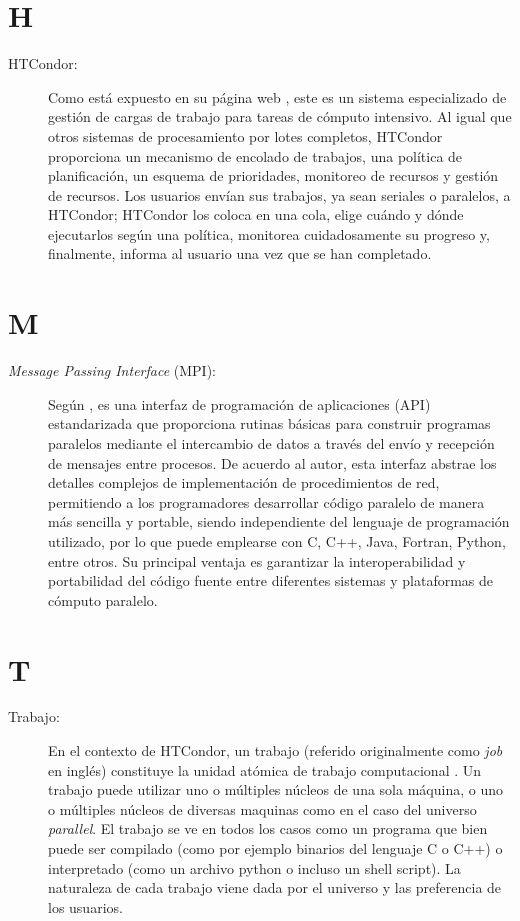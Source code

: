 \section*{H}
\begin{description}
	\item[HTCondor:] Como está expuesto en su página web \citep{HTCondor}, este es un sistema especializado de gestión de cargas de trabajo para tareas de cómputo intensivo. Al igual que otros sistemas de procesamiento por lotes completos, HTCondor proporciona un mecanismo de encolado de trabajos, una política de planificación, un esquema de prioridades, monitoreo de recursos y gestión de recursos. Los usuarios envían sus trabajos, ya sean seriales o paralelos, a HTCondor; HTCondor los coloca en una cola, elige cuándo y dónde ejecutarlos según una política, monitorea cuidadosamente su progreso y, finalmente, informa al usuario una vez que se han completado.
\end{description}

\section*{M}
\begin{description}
	\item[\textit{Message Passing Interface} (MPI):] Según \cite{Nielsen2016}, \MPI es una interfaz de programación de aplicaciones (API) estandarizada que proporciona rutinas básicas para construir programas paralelos mediante el intercambio de datos a través del envío y recepción de mensajes entre procesos. De acuerdo al autor, esta interfaz abstrae los detalles complejos de implementación de procedimientos de red, permitiendo a los programadores desarrollar código paralelo de manera más sencilla y portable, siendo independiente del lenguaje de programación utilizado, por lo que puede emplearse con C, C++, Java, Fortran, Python, entre otros. Su principal ventaja es garantizar la interoperabilidad y portabilidad del código fuente entre diferentes sistemas y plataformas de cómputo paralelo. \end{description}

\section*{T}
\begin{description}
	\item [Trabajo:] En el contexto de HTCondor, un trabajo (referido originalmente como \textit{job} en inglés) constituye la unidad atómica de trabajo computacional \citep{HTCondor-what-is-a-job}. Un trabajo puede utilizar uno o múltiples núcleos de una sola máquina, o uno o múltiples núcleos de diversas maquinas como en el caso del universo \textit{parallel}. El trabajo se ve en todos los casos como un programa que bien puede ser compilado (como por ejemplo binarios del lenguaje C o C++) o interpretado (como un archivo python o incluso un shell script). La naturaleza de cada trabajo viene dada por el universo y las preferencia de los usuarios.
\end{description}


